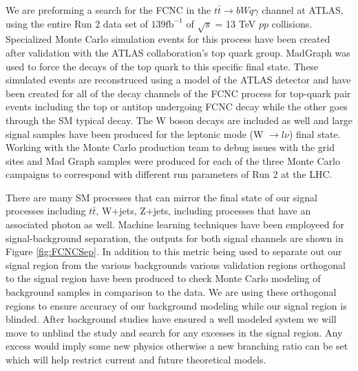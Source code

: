 \documentclass[12pt,letterpaper]{article}
\begin{document}
\par We are preforming a search for the FCNC in the $t\bar{t} \rightarrow bWq\gamma$ channel at ATLAS, using the entire Run 2 data set of $139\text{fb}^{-1}$ of $\sqrt{s}$ = 13 TeV $pp$ collisions.  Specialized Monte Carlo simulation events for this process have been created after validation with the ATLAS collaboration's top quark group.  MadGraph was used to force the decays of the top quark to this specific final state.  These simulated events are reconstruced using a model of the ATLAS detector and have been created for all of the decay channels of the FCNC process for top-quark pair events including the top or antitop undergoing FCNC decay while the other goes through the SM typical decay.  The W boson decays are included as well and large signal samples have been produced for the leptonic mode (W $\rightarrow l \nu$) final state.  Working with the Monte Carlo production team to debug issues with the grid sites and Mad Graph samples were produced for each of the three Monte Carlo campaigns to correspond with different run parameters of Run 2 at the LHC. 

\par There are many SM processes that can mirror the final state of our signal processes including $t\bar{t}$, W+jets, Z+jets, including processes that have an associated photon as well.  Machine learning techniques have been employeed for signal-background separation, the outputs for both signal channels are shown in Figure \ref{fig:FCNCSep}.  In addition to this metric being used to separate out our signal region from the various backgrounds various validation regions orthogonal to the signal region have been produced to check Monte Carlo modeling of background samples in comparison to the data.  We are using these orthogonal regions to ensure accuracy of our background modeling while our signal region is blinded.  After background studies have ensured a well modeled system we will move to unblind the study and search for any excesses in the signal region.  Any excess would imply some new physics otherwise a new branching ratio can be set which will help restrict current and future theoretical models.
\end{document}
